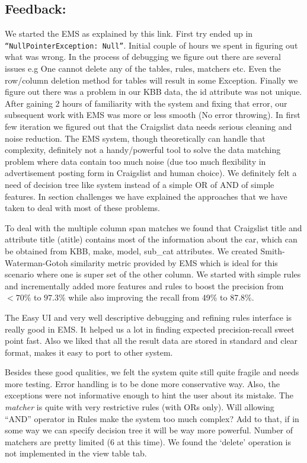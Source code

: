 \documentclass[dvips,11pt]{article}
\begin{document}
\subsection{Feedback:} %
We started the EMS as explained by this link. First try ended up in {\tt ``NullPointerException:
  Null''}. Initial couple of hours we spent in figuring out what was wrong. In the process of
debugging we figure out there are several issues e.g One cannot delete any of the tables, rules,
matchers etc.  Even the row/column deletion method for tables will result in some Exception. Finally
we figure out there was a problem in our KBB data, the id attribute was not unique. After gaining 2
hours of familiarity with the system and fixing that error, our subsequent work with EMS was more or
less smooth (No error throwing).  In first few iteration we figured out that the Craigslist data
needs serious cleaning and noise reduction. The EMS system, though theoretically can handle that
complexity, definitely not a handy/powerful tool to solve the data matching problem where data
contain too much noise (due too much flexibility in advertisement posting form in Craigslist and
human choice). We definitely felt a need of decision tree like system instead of a simple OR of AND
of simple features.  In section challenges we have explained the approaches that we have taken to
deal with most of these problems.

To deal with the multiple column span matches we found that Craigslist title and attribute title
(atitle) contains most of the information about the car, which can be obtained from KBB, make,
model, sub\_cat attributes. We created Smith-Waterman-Gotoh similarity metric provided by EMS which
is ideal for this scenario where one is super set of the other column. We started with simple rules
and incrementally added more features and rules to boost the precision from $<70\%$ to $97.3\%$
while also improving the recall from 49\% to 87.8\%.

The Easy UI and very well descriptive debugging and refining rules interface is really good in
EMS. It helped us a lot in finding expected precision-recall sweet point fast. Also we liked that
all the result data are stored in standard and clear format, makes it easy to port to other system.
 
Besides these good qualities, we felt the system quite still quite fragile and needs more
testing. Error handling is to be done more conservative way. Also, the exceptions were not
informative enough to hint the user about its mistake. The {\em matcher} is quite with very
restrictive rules (with {\sc OR}s only). Will allowing ``AND'' operator in Rules make the system too
much complex? Add to that, if in some way we can specify decision tree it will be way more powerful.
Number of matchers are pretty limited (6 at this time).  We found the `delete' operation is not
implemented in the view table tab.
\end{document}
